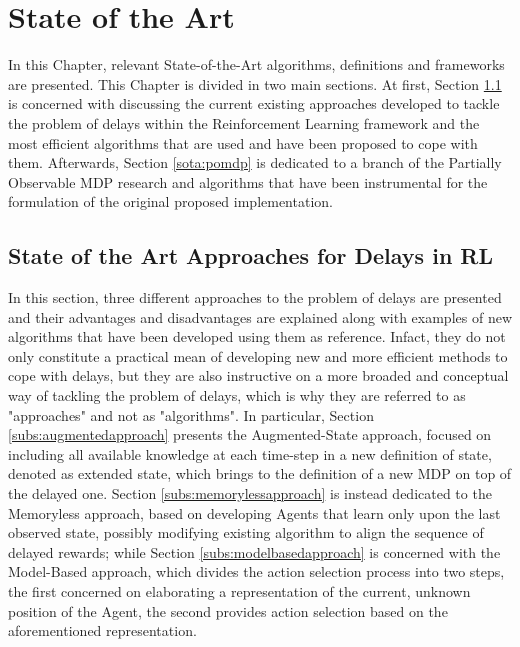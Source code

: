  \chapter{State of the Art}
    \label{chp:sota}
    In this Chapter, relevant State-of-the-Art algorithms, definitions and frameworks are presented. This Chapter is divided in two main sections. At first, Section \ref{sota:delay_approaches} is concerned with discussing the current existing approaches developed to tackle the problem of delays within the Reinforcement Learning framework and the most efficient algorithms that are used and have been proposed to cope with them. Afterwards, Section \ref{sota:pomdp} is dedicated to a branch of the Partially Observable MDP research and algorithms that have been instrumental for the formulation of the original proposed implementation.
    
    \section{State of the Art Approaches for Delays in RL}
        \label{sota:delay_approaches}
        In this section, three different approaches to the problem of delays are presented and their advantages and disadvantages are explained along with examples of new algorithms that have been developed using them as reference. Infact, they do not only constitute a practical mean of developing new and more efficient methods to cope with delays, but they are also instructive on a more broaded and conceptual way of tackling the problem of delays, which is why they are referred to as "approaches" and not as "algorithms". \newline
        In particular, Section \ref{subs:augmentedapproach} presents the Augmented-State approach, focused on including all available knowledge at each time-step in a new definition of state, denoted as extended state, which brings to the definition of a new MDP on top of the delayed one. Section \ref{subs:memorylessapproach} is instead dedicated to the Memoryless approach, based on developing Agents that learn only upon the last observed state, possibly modifying existing algorithm to align the sequence of delayed rewards; while Section \ref{subs:modelbasedapproach} is concerned with the Model-Based approach, which divides the action selection process into two steps, the first concerned on elaborating a representation of the current, unknown position of the Agent, the second provides action selection based on the aforementioned representation.
        
